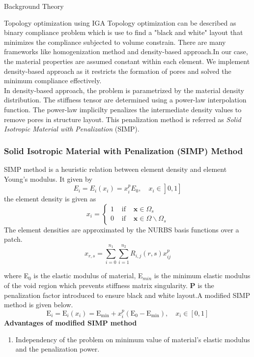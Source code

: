 \documentclass[a4paper,12pt,times]{article}
\begin{document}
\begin{section}{Background Theory}
\begin{subsection}{Topology optimization using IGA}
Topology optimization can be described as binary compliance problem which is use to find a "black and white" layout that minimizes the compliance subjected to volume constrain. There are many frameworks like homogenization method and density-based approach.In our case, the material properties are assumed constant within each element. We implement density-based approach as it restricts the formation of pores and solved the minimum compliance effectively.\\
In density-based approach, the problem is parametrized by the material density distribution. The stiffness tensor are determined using a power-law interpolation function. The power-law implicilty penalizes the intermediate density values to remove pores in structure layout. This penalization method is referred as \textit{ Solid Isotropic Material with Penalization} (SIMP). 

\subsubsection{Solid Isotropic Material with Penalization (SIMP) Method}
SIMP method is a heuristic relation
between element density  and element Young’s modulus. It given by 
\begin{equation}
\left.\left.E_{i}=E_{i}\left(x_{i}\right)=x_{i}^{p} E_{0}, \quad x_{i} \in\right] 0,1\right]
\end{equation}
the element density is given as
\begin{equation}
x_i=\left\{\begin{array}{lll}
1 & \text { if } & \mathbf{x} \in \Omega_{s} \\
0 & \text { if } & \mathbf{x} \in \Omega \backslash \Omega_{s}
\end{array}\right.
\end{equation}
The element densities are approximated by the NURBS basis functions over a patch.
\begin{equation}
x_{r, s}=\sum_{i=0}^{n_{1}} \sum_{i=1}^{n_{2}} R_{i, j}(r, s) x^{p}_{i j}
\end{equation}

where E$_0$ is the elastic modulus of material, E$_{min}$ is the minimum elastic modulus of the void region which prevents stiffness matrix singularity. \textbf{P} is the penalization factor introduced to ensure black and white layout.A modified SIMP method is given below.
\begin{equation}
\mathrm{E}_{i}=\mathrm{E}_{i}\left(x_{i}\right)=\mathrm{E}_{\min }+x_{i}^{p}\left(\mathrm{E}_{0}-\mathrm{E}_{\min }\right), \quad x_{i} \in[0,1]
\end{equation}
\textbf{Advantages of modified SIMP method}
\begin{enumerate}
\item Independency of the problem on minimum value of material's elastic modulus and the penalization power.
\end{enumerate}


\end{subsection}
\end{section}
\end{document}
